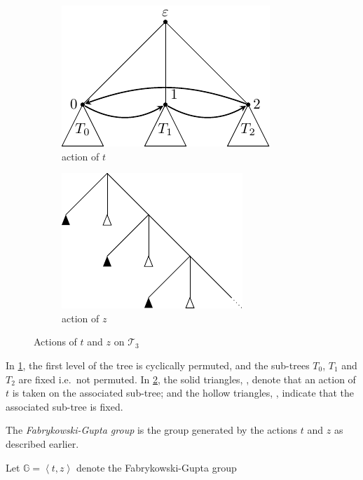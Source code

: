 \begin{figure}[!ht]
	\centering

	\begin{subfigure}[b]{.48\linewidth}
		\centering
		\includegraphics{figures/groupActions/tAction}
		\caption{action of $t$}
		\label{fig:action-t}
	\end{subfigure}
	\hfill
	\begin{subfigure}[b]{.48\linewidth}
		\centering
		\includegraphics{figures/groupActions/zAction}
		\caption{action of $z$}
		\label{fig:action-z}
	\end{subfigure}

	\caption{Actions of $t$ and $z$ on $\mathcal{T}_3$}
	\label{fig:actions}
\end{figure}

In \cref{fig:action-t}, the first level of the tree is cyclically permuted, and the sub-trees $T_0$, $T_1$ and $T_2$ are fixed i.e.\ not permuted.
In \cref{fig:action-z}, the solid triangles, \tActionNotation, denote that an action of $t$ is taken on the associated sub-tree; and the hollow triangles, \idActionNotation, indicate that the associated sub-tree is fixed.

The \emph{Fabrykowski-Gupta group} is the group generated by the actions $t$ and $z$ as described earlier.

\begin{notation}
	Let $\mathbb{G} = \left\langle t, z \right\rangle$ denote the Fabrykowski-Gupta group
	\thmendmark
\end{notation}

